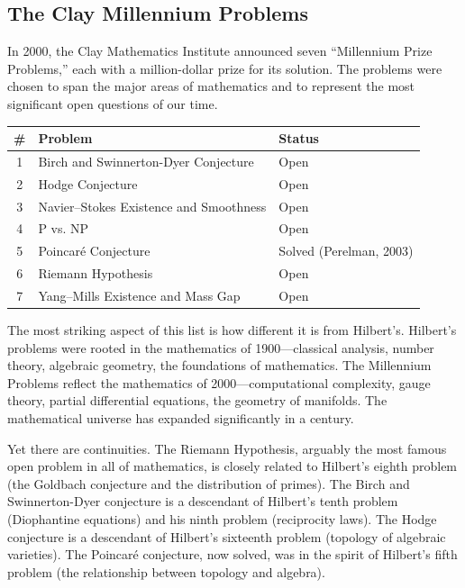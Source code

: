 \subsection{The Clay Millennium Problems}

In 2000, the Clay Mathematics Institute announced seven ``Millennium Prize Problems,'' each with a million-dollar prize for its solution. The problems were chosen to span the major areas of mathematics and to represent the most significant open questions of our time.

\begin{center}
\small
\renewcommand{\arraystretch}{1.2}
\begin{tabular}{cll}
\toprule
\textbf{\#} & \textbf{Problem} & \textbf{Status} \\
\midrule
1 & Birch and Swinnerton-Dyer Conjecture & Open \\
2 & Hodge Conjecture & Open \\
3 & Navier--Stokes Existence and Smoothness & Open \\
4 & P vs. NP & Open \\
5 & Poincar\'e Conjecture & Solved (Perelman, 2003) \\
6 & Riemann Hypothesis & Open \\
7 & Yang--Mills Existence and Mass Gap & Open \\
\bottomrule
\end{tabular}
\end{center}

The most striking aspect of this list is how different it is from Hilbert's. Hilbert's problems were rooted in the mathematics of 1900---classical analysis, number theory, algebraic geometry, the foundations of mathematics. The Millennium Problems reflect the mathematics of 2000---computational complexity, gauge theory, partial differential equations, the geometry of manifolds. The mathematical universe has expanded significantly in a century.

Yet there are continuities. The Riemann Hypothesis, arguably the most famous open problem in all of mathematics, is closely related to Hilbert's eighth problem (the Goldbach conjecture and the distribution of primes). The Birch and Swinnerton-Dyer conjecture is a descendant of Hilbert's tenth problem (Diophantine equations) and his ninth problem (reciprocity laws). The Hodge conjecture is a descendant of Hilbert's sixteenth problem (topology of algebraic varieties). The Poincar\'e conjecture, now solved, was in the spirit of Hilbert's fifth problem (the relationship between topology and algebra).

